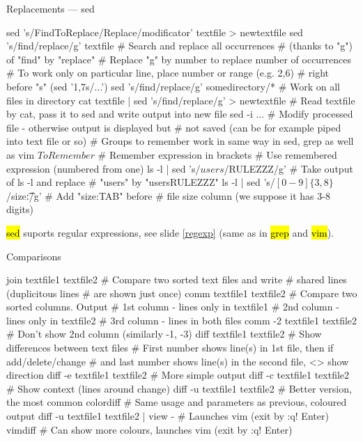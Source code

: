 \documentclass[compress, ucs, xelatex, 11pt, xcolor=svgnames,
  hyperref={
    bookmarks=true,
    unicode=true,
    colorlinks=true,
    pdftitle={Linux, command line and MetaCentrum},
    plainpages=false,
    pdfauthor={Vojtech Zeisek},
    pdfsubject={Course about use of Linux command line, writing shell scripts and using MetaCentrum of CESNET},
    pdfcreator={XeLaTeX, http://www.xelatex.org/},
    pdfkeywords={Linux, GNU, BASH, shell, command line, MetaCentrum},
    linkcolor=Sienna,
    anchorcolor=black,
    citecolor=green,
    filecolor=magenta,
    menucolor=Sienna,
    urlcolor=cyan,
    pdftex},
  url={hyphens, lowtilde} %
  ]{beamer}
\renewcommand{\texttt}[1]{\hl{\ttfamily #1}}
\begin{document}
\begin{frame}[fragile]{Replacements --- sed}
  \begin{bashcode}
    sed 's/FindToReplace/Replace/modificator' textfile > newtextfile
    sed 's/find/replace/g' textfile # Search and replace all occurrences
                                    # (thanks to "g") of "find" by "replace"
    # Replace "g" by number to replace number of occurrences
    # To work only on particular line, place number or range (e.g. 2,6)
    # right before "s" (sed '1,7s/...')
    sed 's/find/replace/g' somedirectory/* # Work on all files in directory
    cat textfile | sed 's/find/replace/g' > newtextfile
      # Read textfile by cat, pass it to sed and write output into new file
    sed -i ... # Modify processed file - otherwise output is displayed but
               # not saved (can be for example piped into text file or so)
    # Groups to remember work in same way in sed, grep as well as vim
    \(ToRemember\) # Remember expression in brackets
    \Number # Use remembered expression (numbered from one)
    ls -l | sed 's/\(users\)/\1RULEZZZ/g' # Take output of ls -l and replace
                                          # "users" by "usersRULEZZZ"
    ls -l | sed 's/\([0-9]\{3,8\}\)/size:\t\1/g' # Add "size:TAB" before
                       # file size column (we suppose it has 3-8 digits)
  \end{bashcode}
\texttt{sed} suports regular expressions, see slide \ref{regexp} (same as in \texttt{grep} and \texttt{vim}).
\end{frame}

\begin{frame}[fragile]{Comparisons}
  \begin{bashcode}
    join textfile1 textfile2 # Compare two sorted text files and write
                             # shared lines (duplicitous lines 
                             # are shown just once)
    comm textfile1 textfile2 # Compare two sorted columns. Output
      # 1st column - lines only in textfile1
      # 2nd column - lines only in textfile2
      # 3rd column - lines in both files
    comm -2 textfile1 textfile2 # Don't show 2nd column (similarly -1, -3)
    diff textfile1 textfile2 # Show differences between text files
      # First number shows line(s) in 1st file, then if add/delete/change
      # and last number shows line(s) in the second file, <> show direction
    diff -e textfile1 textfile2 # More simple output
    diff -c textfile1 textfile2 # Show context (lines around change)
    diff -u textfile1 textfile2 # Better version, the most common
    colordiff # Same usage and parameters as previous, coloured output
    diff -u textfile1 textfile2 | view - # Launches vim (exit by :q! Enter)
    vimdiff # Can show more colours, launches vim (exit by :q! Enter)
  \end{bashcode}
\end{frame}
\end{document}
